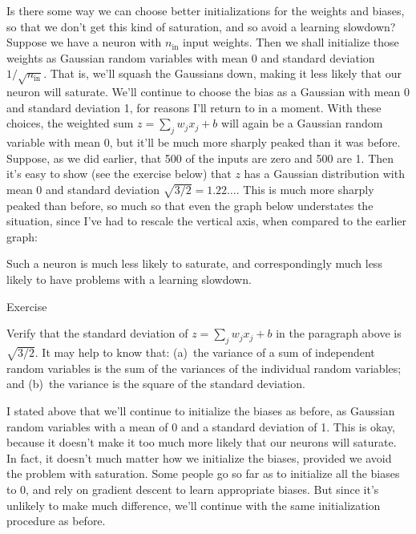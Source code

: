 \documentclass[a4paper,twoside,10pt]{book}
\begin{document}
Is there some way we can choose better initializations for the weights and biases, so that we don't get this kind of saturation, and so avoid a learning slowdown? Suppose we have a neuron with $n_\mathrm{in}$ input weights. Then we shall initialize those weights as Gaussian random variables with mean 0 and standard deviation $1/\sqrt{n_\mathrm{in}}$. That is, we'll squash the Gaussians down, making it less likely that our neuron will saturate. We'll continue to choose the bias as a Gaussian with mean 0 and standard deviation 1, for reasons I'll return to in a moment. With these choices, the weighted sum $z=\sum_jw_jx_j+b$ will again be a Gaussian random variable with mean 0, but it'll be much more sharply peaked than it was before. Suppose, as we did earlier, that 500 of the inputs are zero and 500 are 1. Then it's easy to show (see the exercise below) that $z$ has a Gaussian distribution with mean 0 and standard deviation $\sqrt{3/2}=1.22\ldots$. This is much more sharply peaked than before, so much so that even the graph below understates the situation, since I've had to rescale the vertical axis, when compared to the earlier graph:
\begin{center}
\end{center}
Such a neuron is much less likely to saturate, and correspondingly much less likely to have problems with a learning slowdown.

\begin{exercize}{Exercise}
	\item Verify that the standard deviation of $z=\sum_jw_jx_j+b$ in the paragraph above is $\sqrt{3/2}$. It may help to know that: (a)~the variance of a sum of independent random variables is the sum of the variances of the individual random variables; and (b)~the variance is the square of the standard deviation.
\end{exercize}
I stated above that we'll continue to initialize the biases as before, as Gaussian random variables with a mean of 0 and a standard deviation of 1. This is okay, because it doesn't make it too much more likely that our neurons will saturate. In fact, it doesn't much matter how we initialize the biases, provided we avoid the problem with saturation. Some people go so far as to initialize all the biases to 0, and rely on gradient descent to learn appropriate biases. But since it's unlikely to make much difference, we'll continue with the same initialization procedure as before.
\end{document}
